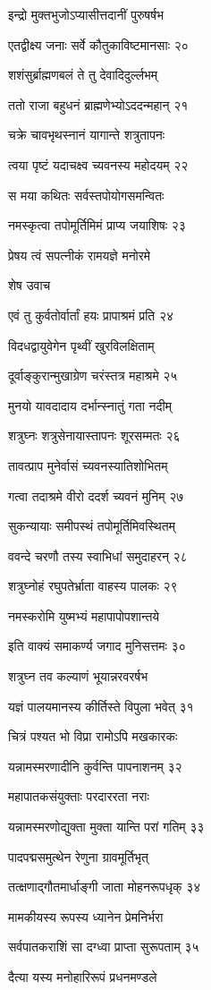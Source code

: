 इन्द्रो मुक्तभुजोऽप्यासीत्तदानीं पुरुषर्षभ

एतद्वीक्ष्य जनाः सर्वे कौतुकाविष्टमानसाः २०

शशंसुर्ब्राह्मणबलं ते तु देवादिदुर्ल्लभम्

ततो राजा बहुधनं ब्राह्मणेभ्योऽददन्महान् २१

चक्रे चावभृथस्नानं यागान्ते शत्रुतापनः

त्वया पृष्टं यदाचक्ष्व च्यवनस्य महोदयम् २२

स मया कथितः सर्वस्तपोयोगसमन्वितः

नमस्कृत्वा तपोमूर्तिमिमं प्राप्य जयाशिषः २३

प्रेषय त्वं सपत्नीकं रामयज्ञे मनोरमे

शेष उवाच

एवं तु कुर्वतोर्वार्तां हयः प्रापाश्रमं प्रति २४

विदधद्वायुवेगेन पृथ्वीं खुरविलक्षिताम्

दूर्वाङ्कुरान्मुखाग्रेण चरंस्तत्र महाश्रमे २५

मुनयो यावदादाय दर्भान्स्नातुं गता नदीम्

शत्रुघ्नः शत्रुसेनायास्तापनः शूरसम्मतः २६

तावत्प्राप मुनेर्वासं च्यवनस्यातिशोभितम्

गत्वा तदाश्रमे वीरो ददर्श च्यवनं मुनिम् २७

सुकन्यायाः समीपस्थं तपोमूर्तिमिवस्थितम्

ववन्दे चरणौ तस्य स्वाभिधां समुदाहरन् २८

शत्रुघ्नोहं रघुपतेर्भ्राता वाहस्य पालकः २९

नमस्करोमि युष्मभ्यं महापापोपशान्तये

इति वाक्यं समाकर्ण्य जगाद मुनिसत्तमः ३०

शत्रुघ्न तव कल्याणं भूयान्नरवरर्षभ

यज्ञं पालयमानस्य कीर्तिस्ते विपुला भवेत् ३१

चित्रं पश्यत भो विप्रा रामोऽपि मखकारकः

यन्नामस्मरणादीनि कुर्वन्ति पापनाशनम् ३२

महापातकसंयुक्ताः परदाररता नराः

यन्नामस्मरणोद्युक्ता मुक्ता यान्ति परां गतिम् ३३

पादपद्मसमुत्थेन रेणुना ग्रावमूर्तिभृत्

तत्क्षणाद्गौतमार्धाङ्गी जाता मोहनरूपधृक् ३४

मामकीयस्य रूपस्य ध्यानेन प्रेमनिर्भरा

सर्वपातकराशिं सा दग्ध्वा प्राप्ता सुरूपताम् ३५

दैत्या यस्य मनोहारिरूपं प्रधनमण्डले

